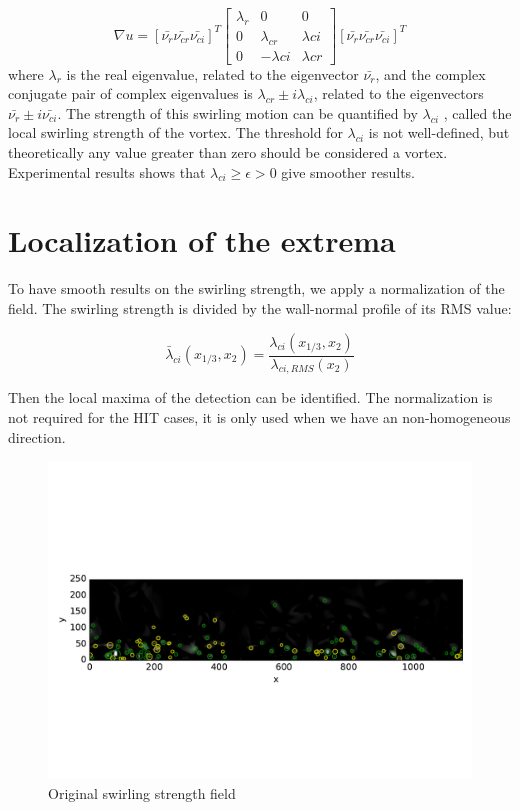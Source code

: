 \documentclass[12pt, a4paper, openany]{memoir}
\begin{document}
\begin{equation}
\nabla u = [\bar{\nu_r} \bar{\nu_{cr}} \bar{\nu_{ci}}]^T
\left[\begin{array}{ccc}
\lambda_r & 0 & 0 \\
0 & \lambda_{cr} & \lambda{ci} \\
0 & -\lambda{ci} & \lambda{cr} \end{array}\right]
[\bar{\nu_r} \bar{\nu_{cr}} \bar{\nu_{ci}}]^T
\end{equation} 
where $\lambda_r$ is the real eigenvalue, related to the eigenvector $\bar{\nu_r}$, and the complex conjugate pair of complex eigenvalues is $\lambda_{cr}  \pm i\lambda_{ci}$, related to the eigenvectors $\bar{\nu_r} \pm i\bar{\nu_{ci}}$. The strength of this swirling motion can be quantified by $\lambda_{ci}$ , called the local swirling strength of the vortex. The threshold for $\lambda_{ci}$ is not well-defined, but theoretically any value greater than zero should be considered a vortex. Experimental results \cite{zhou1999} shows that $\lambda_{ci} \geq \epsilon > 0$ give smoother results.



\section{Localization of the extrema}

To have smooth results on the swirling strength, we apply a normalization of the field. The swirling strength is divided by the wall-normal profile of its RMS value:

\begin{equation}
\bar{\lambda}_{ci}(x_{1/3},x_2) = \frac{\lambda_{ci}(x_{1/3},x_2)}{\lambda_{ci,RMS}(x_2)}
\end{equation}

Then the local maxima of the detection can be identified. The normalization is not required for the HIT cases, it is only used when we have an non-homogeneous direction.

\begin{figure}[h]
	\centering
	\includegraphics[trim=0 130 0 130 ,clip, width=\textwidth]{figure/PIVnonnormalized.pdf}
	\caption{Original swirling strength field}
	\label{fig:nonnorm}
\end{figure}
\end{document}
